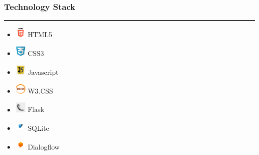 \documentclass[14pt]{beamer}
\begin{document}
\begin{frame}
    \frametitle{Technology Stack}
    \noindent
    {\color{pink} \rule{\linewidth}{0.7mm} }
    \begin{itemize}
        \item [] \includegraphics[width=0.2in, height=0.2in]{./Codiac/logos/html.png} HTML5 \\
            
        \item [] \includegraphics[width=0.2in, height=0.2in]{./Codiac/logos/css.png} CSS3 \\
            
        \item [] \includegraphics[width=0.2in, height=0.2in]{./Codiac/logos/java.png} Javascript \\
            
        \item [] \includegraphics[width=0.2in, height=0.2in]{./Codiac/logos/w3.png} W3.CSS \\
            
        \item [] \includegraphics[width=0.2in, height=0.2in]{./Codiac/logos/flask.jpg} Flask \\
            
        \item [] \includegraphics[width=0.2in, height=0.2in]{./Codiac/logos/sqllite.png} SQLite \\
            
        \item [] \includegraphics[width=0.2in, height=0.2in]{./Codiac/logos/dialogflow.jpg} Dialogflow \\
            

\end{itemize}
\end{frame}
\end{document}

